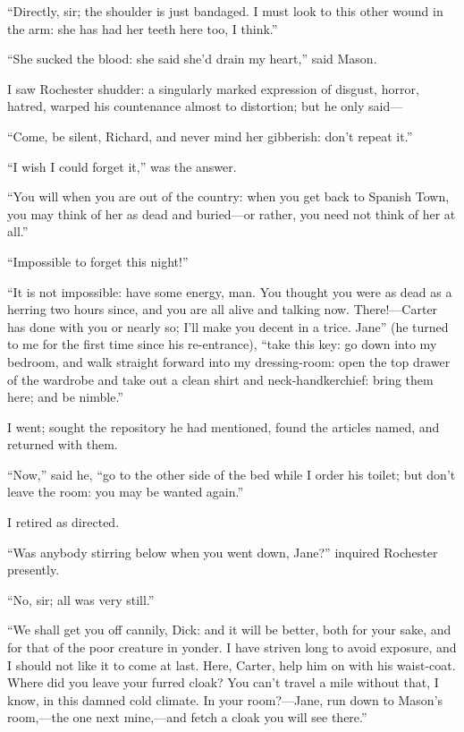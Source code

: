 \enquote{Directly, sir; the shoulder is just bandaged. I must look to
this other wound in the arm: she has had her teeth here too, I think.}

\enquote{She sucked the blood: she said she'd drain my heart,} said
Mason.

I saw \Mr{} Rochester shudder: a singularly marked expression of disgust,
horror, hatred, warped his countenance almost to distortion; but he only
said---

\enquote{Come, be silent, Richard, and never mind her gibberish: don't
repeat it.}

\enquote{I wish I could forget it,} was the answer.

\enquote{You will when you are out of the country: when you get back to
Spanish Town, you may think of her as dead and buried---or rather, you
need not think of her at all.}

\enquote{Impossible to forget this night!}

\enquote{It is not impossible: have some energy, man. You thought you
were as dead as a herring two hours since, and you are all alive and
talking now. There!---Carter has done with you or nearly so; I'll make
you decent in a trice. Jane} (he turned to me for the first time since
his re-entrance), \enquote{take this key: go down into my bedroom, and
walk straight forward into my dressing-room: open the top drawer of the
wardrobe and take out a clean shirt and neck-handkerchief: bring them
here; and be nimble.}

I went; sought the repository he had mentioned, found the articles
named, and returned with them.

\enquote{Now,} said he, \enquote{go to the other side of the bed while I
order his toilet; but don't leave the room: you may be wanted again.}

I retired as directed.

\enquote{Was anybody stirring below when you went down, Jane?} inquired
\Mr{} Rochester presently.

\enquote{No, sir; all was very still.}

\enquote{We shall get you off cannily, Dick: and it will be better, both
for your sake, and for that of the poor creature in yonder. I have
striven long to avoid exposure, and I should not like it to come at
last. Here, Carter, help him on with his waist-coat. Where did you
leave your furred cloak? You can't travel a mile without that, I know,
in this damned cold climate. In your room?---Jane, run down to \Mr{}
Mason's room,---the one next mine,---and fetch a cloak you will see
there.}

